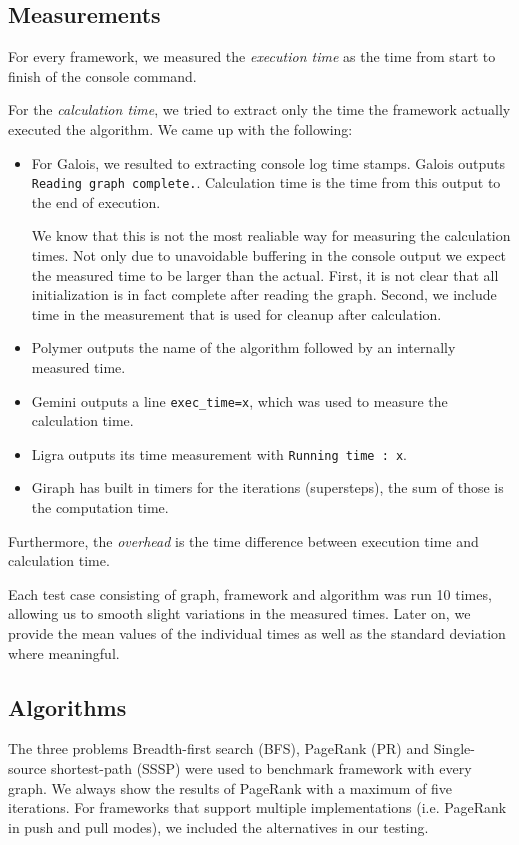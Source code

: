 \subsection{Measurements}
For every framework, we measured the \emph{execution time} as the time from start to finish of the console command.

For the \emph{calculation time}, we tried to extract only the time the framework actually executed the algorithm. We came up with the following:
\begin{itemize}
	\item For Galois, we resulted to extracting console log time stamps. Galois outputs \texttt{Reading graph complete.}. Calculation time is the time from this output to the end of execution.

	We know that this is not the most realiable way for measuring the calculation times. 
	Not only due to unavoidable buffering in the console output we expect the measured time to be larger than the actual.
	First, it is not clear that all initialization is in fact complete after reading the graph. Second, we include time in the measurement that is used for cleanup after calculation.

	\item Polymer outputs the name of the algorithm followed by an internally measured time.

	\item Gemini outputs a line \texttt{exec\_time=x}, which was used to measure the calculation time.

	\item Ligra outputs its time measurement with \texttt{Running time : x}.

	\item Giraph has built in timers for the iterations (supersteps), the sum of those is the computation time.
\end{itemize}
Furthermore, the \emph{overhead} is the time difference between execution time and calculation time.

Each test case consisting of graph, framework and algorithm was run 10 times, allowing us to smooth slight variations in the measured times.
Later on, we provide the mean values of the individual times as well as the standard deviation where meaningful.



\subsection{Algorithms}
The three problems Breadth-first search (BFS), PageRank (PR) and Single-source shortest-path (SSSP) were used to benchmark framework with every graph.
We always show the results of PageRank with a maximum of five iterations.
For frameworks that support multiple implementations (i.e. PageRank in push and pull modes), we included the alternatives in our testing. 

